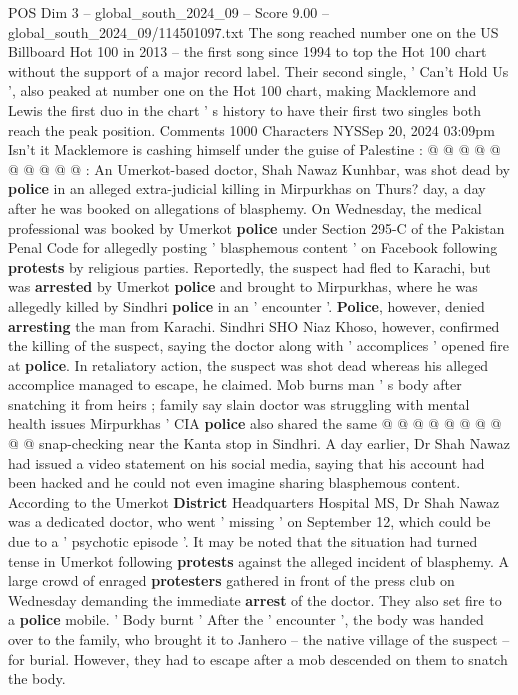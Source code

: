 \begin{textsample}{POS Dim 3 – global\_south\_2024\_09 – Score 9.00 – global\_south\_2024\_09/114501097.txt}
The song reached number one on the US Billboard Hot 100 in 2013 -- the first song since 1994 to top the Hot 100 chart without the support of a major record label.
Their second single, ' Can't Hold Us ', also peaked at number one on the Hot 100 chart, making Macklemore and Lewis the first duo in the chart ' s history to have their first two singles both reach the peak position.
Comments 1000 Characters NYSSep 20, 2024 03:09pm Isn't it Macklemore is cashing himself under the guise of Palestine : @ @ @ @ @ @ @ @ @ @ : An Umerkot-based doctor, Shah Nawaz Kunhbar, was shot dead by \textbf{police} in an alleged extra-judicial killing in Mirpurkhas on Thurs? day, a day after he was booked on allegations of blasphemy.
On Wednesday, the medical professional was booked by Umerkot \textbf{police} under Section 295-C of the Pakistan Penal Code for allegedly posting ' blasphemous content ' on Facebook following \textbf{protests} by religious parties.
Reportedly, the suspect had fled to Karachi, but was \textbf{arrested} by Umerkot \textbf{police} and brought to Mirpurkhas, where he was allegedly killed by Sindhri \textbf{police} in an ' encounter '. \textbf{Police}, however, denied \textbf{arresting} the man from Karachi.
Sindhri SHO Niaz Khoso, however, confirmed the killing of the suspect, saying the doctor along with ' accomplices ' opened fire at \textbf{police}.
In retaliatory action, the suspect was shot dead whereas his alleged accomplice managed to escape, he claimed.
Mob burns man ' s body after snatching it from heirs ; family say slain doctor was struggling with mental health issues Mirpurkhas ' CIA \textbf{police} also shared the same @ @ @ @ @ @ @ @ @ @ snap-checking near the Kanta stop in Sindhri.
A day earlier, Dr Shah Nawaz had issued a video statement on his social media, saying that his account had been hacked and he could not even imagine sharing blasphemous content.
According to the Umerkot \textbf{District} Headquarters Hospital MS, Dr Shah Nawaz was a dedicated doctor, who went ' missing ' on September 12, which could be due to a ' psychotic episode '.
It may be noted that the situation had turned tense in Umerkot following \textbf{protests} against the alleged incident of blasphemy.
A large crowd of enraged \textbf{protesters} gathered in front of the press club on Wednesday demanding the immediate \textbf{arrest} of the doctor.
They also set fire to a \textbf{police} mobile. ' Body burnt ' After the ' encounter ', the body was handed over to the family, who brought it to Janhero -- the native village of the suspect -- for burial.
However, they had to escape after a mob descended on them to snatch the body.

\end{textsample}
